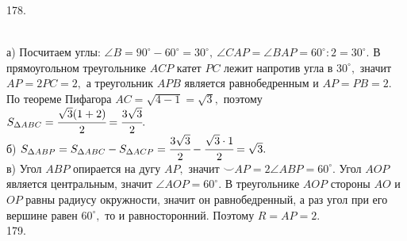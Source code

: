 \documentclass[12pt]{article}
\begin{document}
178. \begin{figure}[ht!]
\end{figure}\\
а) Посчитаем углы: $\angle B=90^\circ-60^\circ=30^\circ,\ \angle CAP=\angle BAP=60^\circ:2=30^\circ.$ В прямоугольном треугольнике $ACP$ катет $PC$ лежит напротив угла в $30^\circ,$ значит $AP=2PC=2,$ а треугольник $APB$ является равнобедренным и $AP=PB=2.$ По теореме Пифагора $AC=\sqrt{4-1}=\sqrt{3},$ поэтому $S_{\Delta ABC}=\cfrac{\sqrt{3}(1+2)}{2}=\cfrac{3\sqrt{3}}{2}.$\\
б) $S_{\Delta ABP}=S_{\Delta ABC}-S_{\Delta ACP}=\cfrac{3\sqrt{3}}{2}-\cfrac{\sqrt{3}\cdot1}{2}=\sqrt{3}.$\\
в) Угол $ABP$ опирается на дугу $AP,$ значит $\smile AP=2\angle ABP=60^\circ.$ Угол $AOP$ является центральным, значит $\angle AOP=60^\circ.$ В треугольнике $AOP$ стороны $AO$ и $OP$ равны радиусу окружности, значит он равнобедренный, а раз угол при его вершине равен $60^\circ,$ то и равносторонний. Поэтому $R=AP=2.$\\
179. \begin{figure}[ht!]
\end{figure}\\
\end{document}
